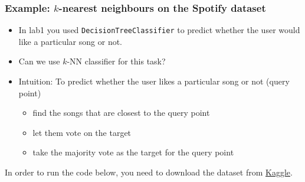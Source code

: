 \documentclass[11pt]{article}
\providecommand{\tightlist}{%
      \setlength{\itemsep}{0pt}\setlength{\parskip}{0pt}}
\begin{document}
    \subsubsection{\texorpdfstring{Example: \(k\)-nearest neighbours on the
Spotify
dataset}{Example: k-nearest neighbours on the Spotify dataset}}\label{example-k-nearest-neighbours-on-the-spotify-dataset}

\begin{itemize}
\tightlist
\item
  In lab1 you used \texttt{DecisionTreeClassifier} to predict whether
  the user would like a particular song or not.
\item
  Can we use \(k\)-NN classifier for this task?
\item
  Intuition: To predict whether the user likes a particular song or not
  (query point)

  \begin{itemize}
  \tightlist
  \item
    find the songs that are closest to the query point
  \item
    let them vote on the target
  \item
    take the majority vote as the target for the query point
  \end{itemize}
\end{itemize}

    In order to run the code below, you need to download the dataset from
\href{https://www.kaggle.com/geomack/spotifyclassification/download}{Kaggle}.
\end{document}
